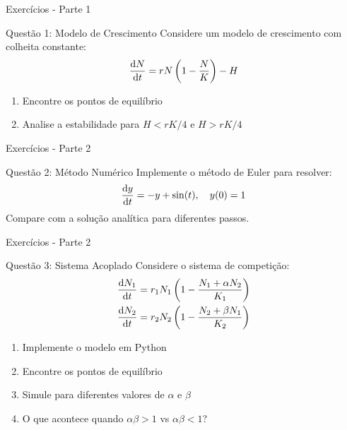 \begin{frame}[allowframebreaks]{Exercícios - Parte 1}
\begin{block}{Questão 1: Modelo de Crescimento}
Considere um modelo de crescimento com colheita constante:
\begin{equation*}
\frac{\mathrm{d} N}{\mathrm{d} t} = rN\left(1 - \frac{N}{K}\right) - H
\end{equation*}
\begin{enumerate}
    \item Encontre os pontos de equilíbrio
    \item Analise a estabilidade para $H < rK/4$ e $H > rK/4$
\end{enumerate}
\end{block}
\end{frame}

\begin{frame}{Exercícios - Parte 2}
\begin{block}{Questão 2: Método Numérico}
Implemente o método de Euler para resolver:
\begin{equation*}
\frac{\mathrm{d} y}{\mathrm{d} t} = -y + \sin(t), \quad y(0) = 1
\end{equation*}
Compare com a solução analítica para diferentes passos.
\end{block}
\end{frame}

\begin{frame}{Exercícios - Parte 2}
\begin{block}{Questão 3: Sistema Acoplado}
Considere o sistema de competição:
\begin{align*}
\frac{\mathrm{d} N_1}{\mathrm{d} t} &= r_1 N_1 \left(1 - \frac{N_1 + \alpha N_2}{K_1}\right)\\
\frac{\mathrm{d} N_2}{\mathrm{d} t} &= r_2 N_2 \left(1 - \frac{N_2 + \beta N_1}{K_2}\right)
\end{align*}

\begin{enumerate}
    \item Implemente o modelo em Python
    \item Encontre os pontos de equilíbrio
    \item Simule para diferentes valores de $\alpha$ e $\beta$
    \item O que acontece quando $\alpha\beta > 1$ vs $\alpha\beta < 1$?
\end{enumerate}
\end{block}
\end{frame}

